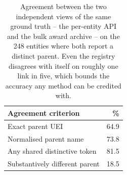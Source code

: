 \begin{table}[t]
\centering
\small
\begin{tabular}{lr}
\toprule
Agreement criterion & \% \\
\midrule
Exact parent UEI & 64.9 \\
Normalised parent name & 73.8 \\
Any shared distinctive token & 81.5 \\
\midrule
Substantively different parent & 18.5 \\
\bottomrule
\end{tabular}
\caption{Agreement between the two independent views of the same ground truth --
the per-entity API and the bulk award archive -- on the 248
entities where both report a distinct parent. Even the registry disagrees with
itself on roughly one link in five, which bounds the accuracy any method can be
credited with.}
\label{tab:reconciliation}
\end{table}
